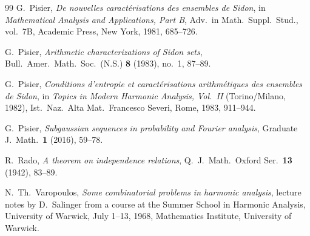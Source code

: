 \documentclass[11pt]{amsart}
\begin{document}
\begin{thebibliography}{99}
G.~Pisier,
\emph{De nouvelles caract\'erisations des ensembles de Sidon},
in \emph{Mathematical Analysis and Applications, Part B},
Adv.\ in Math.\ Suppl.\ Stud., vol.~7B, Academic Press, New York, 1981, 685--726.

G.~Pisier,
\emph{Arithmetic characterizations of Sidon sets},
Bull.\ Amer.\ Math.\ Soc.\ (N.S.) \textbf{8} (1983), no.~1, 87--89.

G.~Pisier,
\emph{Conditions d'entropie et caract\'erisations arithm\'etiques des ensembles de Sidon},
in \emph{Topics in Modern Harmonic Analysis, Vol.~II} (Torino/Milano, 1982),
Ist.\ Naz.\ Alta Mat.\ Francesco Severi, Rome, 1983, 911--944.

G.~Pisier,
\emph{Subgaussian sequences in probability and Fourier analysis},
Graduate J.\ Math.\ \textbf{1} (2016), 59--78.

R.~Rado,
\emph{A theorem on independence relations},
Q.\ J.\ Math.\ Oxford Ser.\ \textbf{13} (1942), 83--89.

N.~Th.~Varopoulos,
\emph{Some combinatorial problems in harmonic analysis},
lecture notes by D.~Salinger from a course at the Summer School in Harmonic Analysis,
University of Warwick, July 1--13, 1968,
Mathematics Institute, University of Warwick.

\end{thebibliography}
\end{document}
